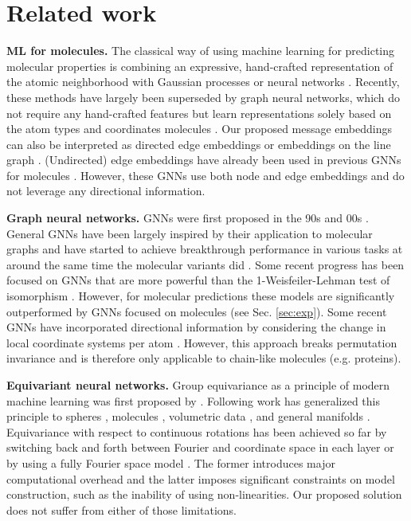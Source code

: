 \documentclass{article} \usepackage{iclr2020_conference,times}
\begin{document}
\section{Related work}



\textbf{ML for molecules.} The classical way of using machine learning for predicting molecular properties is combining an expressive, hand-crafted representation of the atomic neighborhood \citep{bartok_representing_2013} with Gaussian processes \citep{bartok_gaussian_2010,bartok_machine_2017,chmiela_machine_2017} or neural networks \citep{behler_generalized_2007}. Recently, these methods have largely been superseded by graph neural networks, which do not require any hand-crafted features but learn representations solely based on the atom types and coordinates molecules \citep{duvenaud_convolutional_2015,gilmer_neural_2017,schutt_schnet:_2017,hy_predicting_2018,unke_physnet:_2019}. Our proposed message embeddings can also be interpreted as directed edge embeddings or embeddings on the line graph \citep{chen_supervised_2019}. (Undirected) edge embeddings have already been used in previous GNNs for molecules \citep{jorgensen_neural_2018,chen_graph_2019}. However, these GNNs use both node and edge embeddings and do not leverage any directional information.

\textbf{Graph neural networks.} GNNs were first proposed in the 90s \citep{baskin_neural_1997,sperduti_supervised_1997} and 00s \citep{gori_new_2005,scarselli_graph_2009}. General GNNs have been largely inspired by their application to molecular graphs and have started to achieve breakthrough performance in various tasks at around the same time the molecular variants did \citep{kipf_semi-supervised_2017,gasteiger_predict_2019,zambaldi_deep_2019}. Some recent progress has been focused on GNNs that are more powerful than the 1-Weisfeiler-Lehman test of isomorphism \citep{morris_weisfeiler_2019,maron_provably_2019}. However, for molecular predictions these models are significantly outperformed by GNNs focused on molecules (see Sec. \ref{sec:exp}). Some recent GNNs have incorporated directional information by considering the change in local coordinate systems per atom \citep{ingraham_generative_2019}. However, this approach breaks permutation invariance and is therefore only applicable to chain-like molecules (e.g. proteins).

\textbf{Equivariant neural networks.} Group equivariance as a principle of modern machine learning was first proposed by \citet{cohen_group_2016}. Following work has generalized this principle to spheres \citep{cohen_spherical_2018}, molecules \citep{thomas_tensor_2018}, volumetric data \citep{weiler_3d_2018}, and general manifolds \citep{cohen_gauge_2019}. Equivariance with respect to continuous rotations has been achieved so far by switching back and forth between Fourier and coordinate space in each layer \citep{cohen_spherical_2018} or by using a fully Fourier space model \citep{kondor_clebsch-gordan_2018,anderson_cormorant:_2019}. The former introduces major computational overhead and the latter imposes significant constraints on model construction, such as the inability of using non-linearities. Our proposed solution does not suffer from either of those limitations.
\end{document}
